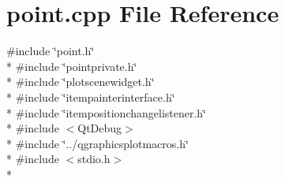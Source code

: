 \section{point.\+cpp File Reference}
\label{curve_2point_8cpp}
{\ttfamily \#include \char`\"{}point.\+h\char`\"{}}\\*
{\ttfamily \#include \char`\"{}pointprivate.\+h\char`\"{}}\\*
{\ttfamily \#include \char`\"{}plotscenewidget.\+h\char`\"{}}\\*
{\ttfamily \#include \char`\"{}itempainterinterface.\+h\char`\"{}}\\*
{\ttfamily \#include \char`\"{}itempositionchangelistener.\+h\char`\"{}}\\*
{\ttfamily \#include $<$Qt\+Debug$>$}\\*
{\ttfamily \#include \char`\"{}../qgraphicsplotmacros.\+h\char`\"{}}\\*
{\ttfamily \#include $<$stdio.\+h$>$}\\*
